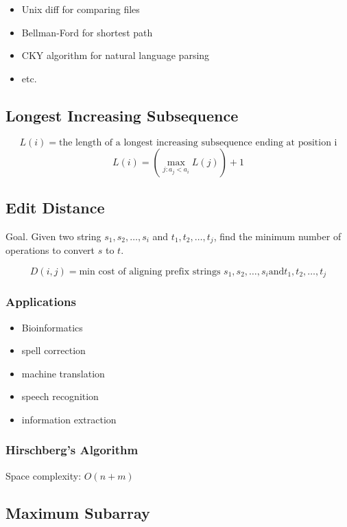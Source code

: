 \documentclass[12pt,a4paper]{article}
\begin{document}
\begin{itemize}
  \item Unix diff for comparing files
  \item Bellman-Ford for shortest path
  \item CKY algorithm for natural language parsing
  \item etc.
\end{itemize}

\subsection*{Longest Increasing Subsequence}

\[L(i) = \text{the length of a longest increasing subsequence ending at position i}\]
\[L(i) = (\max_{j:a_j < a_i}{L(j)})+1\]

\subsection*{Edit Distance}

Goal. Given two string $s_1, s_2, \dots, s_i$ and $t_1, t_2, \dots, t_j$, find the minimum number of operations to convert $s$ to $t$.

\[D(i, j) = \text{min cost of aligning prefix strings } s_1,s_2,\dots,s_i \text{and} t_1,t_2,\dots,t_j\]

\subsubsection*{Applications}

\begin{itemize}
    \item Bioinformatics
    \item spell correction
    \item machine translation
    \item speech recognition
    \item information extraction
\end{itemize}

\subsubsection*{Hirschberg's Algorithm}

Space complexity: $O(n + m)$

\subsection*{Maximum Subarray}
\end{document}
